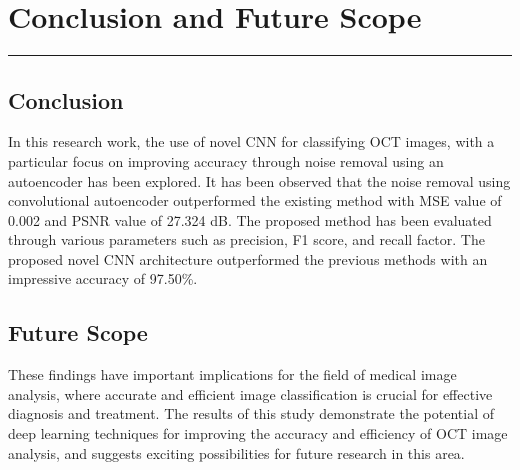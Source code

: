 \chapter{Conclusion and Future Scope}
\label{chapter:conclusion} 
\noindent\rule{\linewidth}{2pt}

\section{Conclusion}
In this research work, the use of novel CNN for classifying OCT images, with a particular focus on improving accuracy through noise removal using an autoencoder has been explored. It has been observed that the noise removal  using convolutional autoencoder outperformed the existing method with  MSE value of 0.002 and PSNR value of 27.324 dB. The proposed method has been evaluated through various parameters such as precision, F1 score, and recall factor. The proposed novel CNN architecture  outperformed the previous methods with an impressive accuracy of 97.50\%. 

\section{Future Scope}
These findings have important implications for the field of medical image analysis, where accurate and efficient image classification is crucial for effective diagnosis and treatment. The results of this study demonstrate the potential of deep learning techniques for improving the accuracy and efficiency of OCT image analysis, and suggests exciting possibilities for future research in this area.